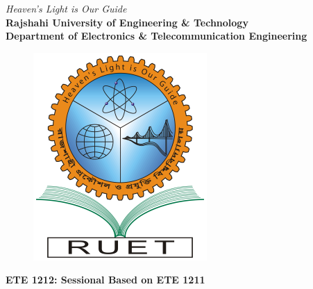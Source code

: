 \begin{titlepage}
    \begin{center}
        \textit{Heaven's Light is Our Guide}
        \\[0.5cm]
        \textbf{\Large Rajshahi University of Engineering \& Technology}
        \\[0.3cm]
        \textbf{\large Department of Electronics \& Telecommunication Engineering}
        \\[0.2cm]
        \begin{figure}[!htbp]
            \centering
            \includegraphics[scale=0.3]{src/logo_ruet}
            \label{fig:RUET logo}
        \end{figure}
        \textbf{\Large ETE 1212: Sessional Based on ETE 1211 }
        \\[0.5cm]
        \myrule[1pt][5pt]



\end{center}
\end{titlepage}
